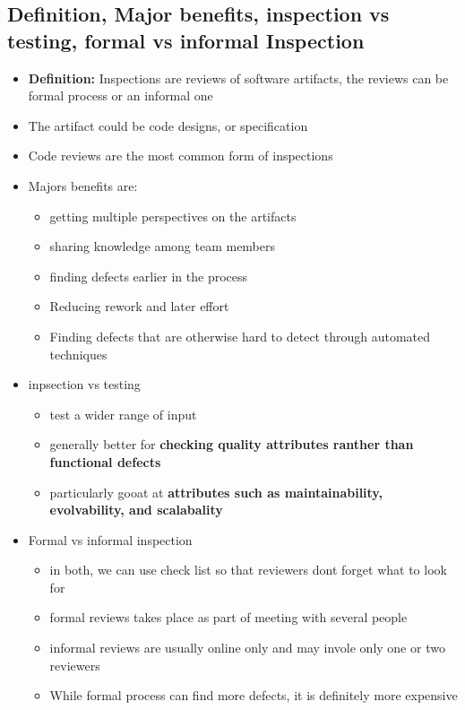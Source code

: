 \documentclass{article}
\begin{document}
 \subsection{Definition, Major benefits, inspection vs testing, formal vs
 informal Inspection}
 \begin{itemize}
   \item \textbf{Definition:} Inspections are reviews of software artifacts, the
   reviews can be formal process or an informal one
   \item The artifact could be code designs, or specification
   \item Code reviews are the most common form of inspections
   \item Majors benefits are:
   \begin{itemize}
     \item getting multiple perspectives on the artifacts
     \item sharing knowledge among team members
     \item finding defects earlier in the process
     \item Reducing rework and later effort
     \item Finding defects that are otherwise hard to detect through automated
     techniques
  \end{itemize}
  \item inpsection vs testing
  \begin{itemize}
    \item test a wider range of input
    \item generally better for \textbf{checking quality attributes ranther than
    functional defects}
    \item particularly gooat at \textbf{attributes such as maintainability,
    evolvability, and scalabality}
  \end{itemize}
  \item Formal vs informal inspection
  \begin{itemize}
    \item in both, we can use check list so that reviewers dont forget what to
    look for
    \item formal reviews takes place as part of meeting with several people
    \item informal reviews are usually online only and may invole only one or
    two reviewers
    \item While formal process can find more defects, it is definitely more
    expensive
  \end{itemize}
 \end{itemize}
 
\end{document}
